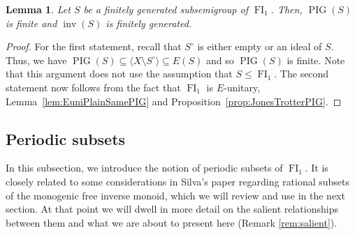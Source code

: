 \documentclass[reqno]{amsart}
\theoremstyle{plain}
\newtheorem{lem}{Lemma}[section]
\theoremstyle{definition}
\DeclareMathOperator{\inv}{inv}
\DeclareMathOperator{\PIG}{PIG}
\DeclareMathOperator{\FI}{FI}
\numberwithin{equation}{section}
\begin{document}
\begin{lem}
\label{lem:subFI1PIG}
Let $S$ be a finitely generated subsemigroup of $\FI_1$. Then, $\PIG(S)$ is finite and $\inv(S)$ is finitely generated.
\end{lem}
\begin{proof}
For the first statement, recall that $S^\circ$ is either empty or an ideal of $S$.
Thus, we have $\PIG(S) \subseteq \langle X\setminus S^\circ\rangle \subseteq  E(S)$ and so $\PIG(S)$ is finite.
Note that this argument does not use the assumption that $S\leq \FI_1$.
The second statement now follows from the fact that $\FI_1$ is $E$-unitary, 
Lemma~\ref{lem:EuniPlainSamePIG} and Proposition~\ref{prop:JonesTrotterPIG}.
\end{proof}

\subsection{Periodic subsets}
\label{subsec:Periodic}

In this subsection, we introduce the notion of periodic subsets of $\FI_1$. It is closely related to some considerations in Silva's paper \cite{SilvaRationalSubset} regarding rational subsets of the monogenic free inverse monoid, which we will review and use in the next section. At that point we will dwell in more detail on the salient relationships between them and what we are about to present here (Remark \ref{rem:salient}).
\end{document}
